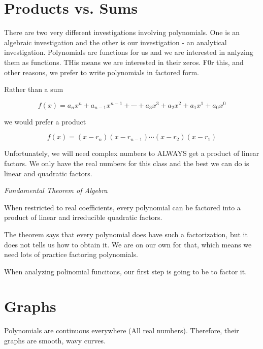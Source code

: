 \documentclass{ximera}
\begin{document}
\section{Products vs. Sums}


There are two very different investigations involving polynomials.  One is an algebraic investigation and the other is our investigation - an analytical investigation.  Polynomials are functions for us and we are interested in anlyzing them as functions.  THis means we are interested in their zeros.  F0r this, and other reasons, we prefer to write polynomials in factored form.



Rather than a sum

\[   f(x) = a_n x^n + a_{n-1} x^{n-1} + \cdots + a_3 x^3 + a_2 x^2 + a_1 x^1 + a_0 x^0      \]

we would prefer a product

\[   f(x) = (x-r_n)(x-r_{n-1})  \cdots (x-r_2)(x-r_1)  \]





Unfortunately, we will need complex numbers to ALWAYS get a product of linear factors.  We only have the real numbers for this class and the best we can do is linear and quadratic factors.



\begin{theorem} \textit{Fundamental Theorem of Algebra}

When restricted to real coefficients, every polynomial can be factored into a product of linear and irreducible quadratic factors.

\end{theorem}


The theorem says that every polynomial does have such a factorization, but it does not tells us how to obtain it.  We are on our own for that, which means we need lots of practice factoring polynomials.

When analyzing polinomial funcitons, our first step is going to be to factor it.





\section {Graphs}




Polynomials are continuous everywhere (All real numbers).  Therefore, their graphs are smooth, wavy curves.
\end{document}
